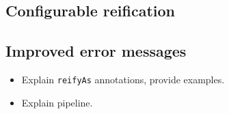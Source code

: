 \subsection{Configurable reification} %
\label{sub:Configurablereification}


\subsection{Improved error messages} %
\label{sub:Improvederrormessages}


\begin{itemize}
    \item Explain \texttt{reifyAs} annotations, provide examples.
    \item Explain pipeline.
\end{itemize}



